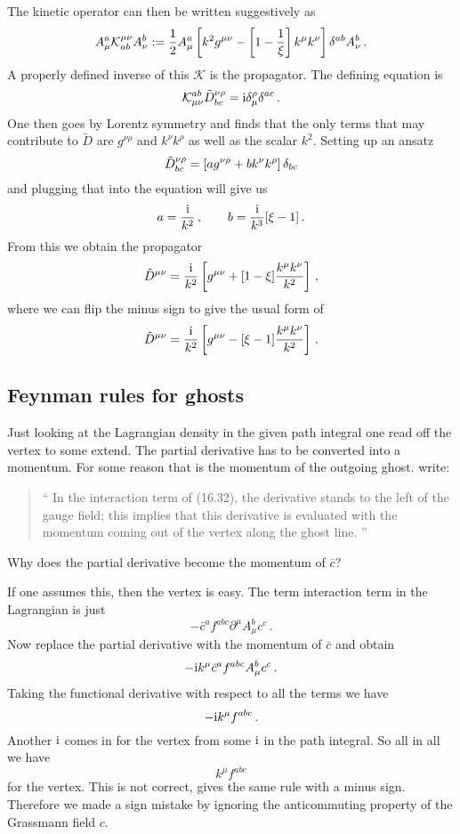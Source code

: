 \documentclass[11pt, english, fleqn, DIV=15, headinclude]{scrartcl}
\begin{document}
The kinetic operator can then be written suggestively as
\[
    A_\mu^a \mathcal K^{\mu\nu}_{ab} A_\nu^b := \frac 12 A_\mu^a \left[ k^2
    g^{\mu\nu} - \left[ 1 - \frac 1\xi \right] k^\mu k^\nu \right] \delta^{ab} A_\nu^b \,.
\]
A properly defined inverse of this $\mathcal K$ is the propagator. The defining
equation is
\[
    \mathcal K_{\mu\nu}^{ab}
    \tilde D^{\nu\rho}_{bc} = \mathrm i \delta^\rho_\mu \delta^{ac} \,.
\]
One then goes by Lorentz symmetry and finds that the only terms that may
contribute to $\tilde D$ are $g^{\nu\rho}$ and $k^\nu k^\rho$ as well as the
scalar $k^2$. Setting up an ansatz
\[
    \tilde D^{\nu\rho}_{bc} = \left[ a g^{\nu\rho} + b k^\nu k^\rho \right] \delta_{bc}
\]
and plugging that into the equation will give us
\[
    a = \frac{\mathrm i}{k^2}
    \,,\qquad
    b = \frac{\mathrm i}{k^3} [\xi - 1] \,.
\]
From this we obtain the propagator
\[
    \tilde D^{\mu\nu} = \frac{\mathrm i}{k^2} \left[ g^{\mu\nu} + [1 - \xi]
    \frac{k^\mu k^\nu}{k^2} \right] \,,
\]
where we can flip the minus sign to give the usual form of
\[
    \tilde D^{\mu\nu} = \frac{\mathrm i}{k^2} \left[ g^{\mu\nu} - [\xi - 1]
    \frac{k^\mu k^\nu}{k^2} \right] \,.
\]

\FloatBarrier
\subsection{Feynman rules for ghosts}

Just looking at the Lagrangian density in the given path integral one read off
the vertex to some extend. The partial derivative has to be converted into a
momentum. For some reason that is the momentum of the outgoing ghost.
\Textcite[514]{Peskin/QFT/1995} write:

\begin{quote}
    \enquote{%
        In the interaction term of (16.32), the derivative stands to the left
        of the gauge field; this implies that this derivative is evaluated with
        the momentum coming out of the vertex along the ghost line.%
    }
\end{quote}

\begin{table}
    \begin{question}
        Why does the partial derivative become the momentum of $\bar c$?
    \end{question}
\end{table}

If one assumes this, then the vertex is easy. The term interaction term in the
Lagrangian is just
\[
    - \bar c^a f^{abc} \partial^\mu A^b_\mu c^c \,.
\]
Now replace the partial derivative with the momentum of $\bar c$ and obtain
\[
    - \mathrm i k^\mu \bar c^a f^{abc} A^b_\mu c^c \,.
\]
Taking the functional derivative with respect to all the terms we have
\[
    - \mathrm i k^\mu f^{abc} \,.
\]
Another $\mathrm i$ comes in for the vertex from some $\mathrm i$ in the path integral.
So all in all we have
\[
    k^\mu f^{abc}
\]
for the vertex. This is not correct, \textcite[Figure~16.5]{Peskin/QFT/1995}
gives the same rule with a minus sign. Therefore we made a sign mistake by
ignoring the anticommuting property of the Grassmann field $c$.
\end{document}
